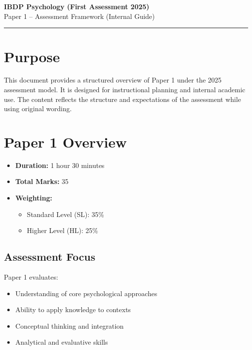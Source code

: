 \documentclass[12pt,a4paper]{article}
\begin{document}
\begin{center}
    {\Large \textbf{IBDP Psychology (First Assessment 2025)}}\\[6pt]
    {\large Paper 1 – Assessment Framework (Internal Guide)}\\[10pt]
    \rule{\textwidth}{0.4pt}
\end{center}

\vspace{0.5cm}

\section*{Purpose}
This document provides a structured overview of Paper 1 under the 2025 assessment model. 
It is designed for instructional planning and internal academic use. 
The content reflects the structure and expectations of the assessment while using original wording.

\newpage

\section{Paper 1 Overview}

\begin{itemize}
    \item \textbf{Duration:} 1 hour 30 minutes
    \item \textbf{Total Marks:} 35
    \item \textbf{Weighting:}
    \begin{itemize}
        \item Standard Level (SL): 35\%
        \item Higher Level (HL): 25\%
    \end{itemize}
\end{itemize}

\subsection*{Assessment Focus}
Paper 1 evaluates:
\begin{itemize}
    \item Understanding of core psychological approaches
    \item Ability to apply knowledge to contexts
    \item Conceptual thinking and integration
    \item Analytical and evaluative skills
\end{itemize}
\end{document}
